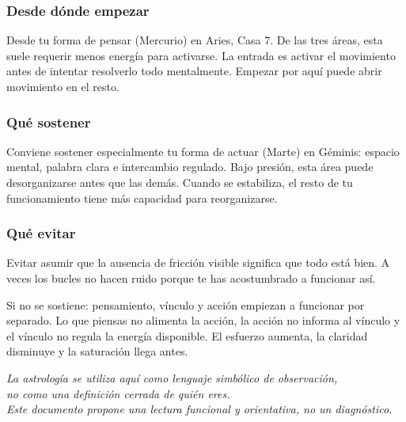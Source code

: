 \documentclass[11pt,a4paper]{article}
\begin{document}
\subsubsection*{Desde dónde empezar}

\justifying
Desde tu forma de pensar (Mercurio) en Aries, Casa 7. De las tres áreas, esta suele requerir menos energía para activarse. La entrada es activar el movimiento antes de intentar resolverlo todo mentalmente. Empezar por aquí puede abrir movimiento en el resto.

\subsubsection*{Qué sostener}

\justifying
Conviene sostener especialmente tu forma de actuar (Marte) en Géminis: espacio mental, palabra clara e intercambio regulado. Bajo presión, esta área puede desorganizarse antes que las demás. Cuando se estabiliza, el resto de tu funcionamiento tiene más capacidad para reorganizarse.

\subsubsection*{Qué evitar}

\justifying
Evitar asumir que la ausencia de fricción visible significa que todo está bien. A veces los bucles no hacen ruido porque te has acostumbrado a funcionar así.

\vspace{0.6cm}

\justifying
Si no se sostiene: pensamiento, vínculo y acción empiezan a funcionar por separado. Lo que piensas no alimenta la acción, la acción no informa al vínculo y el vínculo no regula la energía disponible. El esfuerzo aumenta, la claridad disminuye y la saturación llega antes.

\vspace{1.2cm}

\begin{center}
{\small\itshape\color{grisai}
La astrología se utiliza aquí como lenguaje simbólico de observación,\\
no como una definición cerrada de quién eres.\\[0.2cm]
Este documento propone una lectura funcional y orientativa, no un diagnóstico.
}
\end{center}
\end{document}
